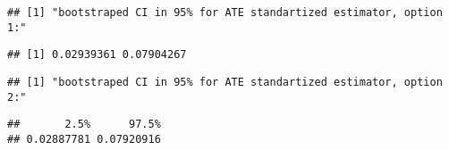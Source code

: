 \documentclass[
]{article}
\newenvironment{Shaded}{\begin{snugshade}}{\end{snugshade}}
\newcommand{\CommentTok}[1]{\textcolor[rgb]{0.56,0.35,0.01}{\textit{#1}}}
\newcommand{\DataTypeTok}[1]{\textcolor[rgb]{0.13,0.29,0.53}{#1}}
\newcommand{\DecValTok}[1]{\textcolor[rgb]{0.00,0.00,0.81}{#1}}
\newcommand{\KeywordTok}[1]{\textcolor[rgb]{0.13,0.29,0.53}{\textbf{#1}}}
\newcommand{\NormalTok}[1]{#1}
\newcommand{\OperatorTok}[1]{\textcolor[rgb]{0.81,0.36,0.00}{\textbf{#1}}}
\newcommand{\StringTok}[1]{\textcolor[rgb]{0.31,0.60,0.02}{#1}}
\begin{document}
\begin{verbatim}
## [1] "bootstraped CI in 95% for ATE standartized estimator, option 1:"
\end{verbatim}

\begin{verbatim}
## [1] 0.02939361 0.07904267
\end{verbatim}

\begin{Shaded}
\end{Shaded}

\begin{verbatim}
## [1] "bootstraped CI in 95% for ATE standartized estimator, option 2:"
\end{verbatim}

\begin{verbatim}
##       2.5%      97.5% 
## 0.02887781 0.07920916
\end{verbatim}
\end{document}
